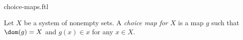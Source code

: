 \documentclass{naproche-library}
\begin{document}
\begin{smodule}[title=Choice Maps]{choice-maps.ftl}

\begin{definition*}[forthel,id=FOUNDATIONS_10_1352015487625913]
  Let $X$ be a system of nonempty sets.
  A \emph{choice map for $X$} is a map $g$ such that $\dom(g) = X$ and $g(x) \in x$ for any $x \in X$.
\end{definition*}
\end{smodule}
\end{document}
